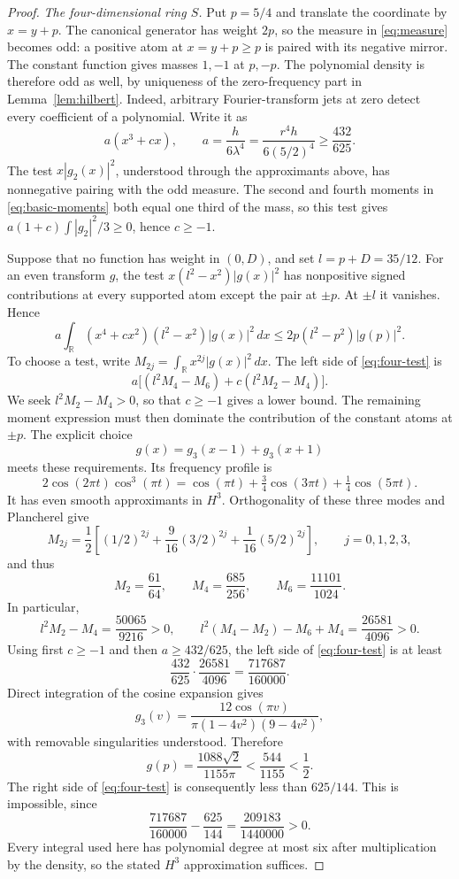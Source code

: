 \documentclass[11pt]{article}
\theoremstyle{definition}
\theoremstyle{remark}
\numberwithin{equation}{section}
\newcommand{\R}{\mathbb R}
\newcommand{\dd}{\,d}
\begin{document}
\begin{proof}
\emph{The four-dimensional ring \(S\).}
Put \(p=5/4\) and translate the coordinate by \(x=y+p\). The canonical generator has weight \(2p\), so the measure in \eqref{eq:measure} becomes odd: a positive atom at \(x=y+p\ge p\) is paired with its negative mirror. The constant function gives masses \(1,-1\) at \(p,-p\). The polynomial density is therefore odd as well, by uniqueness of the zero-frequency part in Lemma~\ref{lem:hilbert}. Indeed, arbitrary Fourier-transform jets at zero detect every coefficient of a polynomial. Write it as
\[
a(x^3+cx),\qquad
a=\frac h{6\lambda^4}
=\frac{r^4h}{6(5/2)^4}\ge\frac{432}{625}.
\]
The test \(x|g_2(x)|^2\), understood through the approximants above, has nonnegative pairing with the odd measure. The second and fourth moments in \eqref{eq:basic-moments} both equal one third of the mass, so this test gives \(a(1+c)\int|g_2|^2/3\ge0\), hence \(c\ge-1\).

Suppose that no function has weight in \((0,D)\), and set \(l=p+D=35/12\). For an even transform \(g\), the test \(x(l^2-x^2)|g(x)|^2\) has nonpositive signed contributions at every supported atom except the pair at \(\pm p\). At \(\pm l\) it vanishes. Hence
\begin{equation}\label{eq:four-test}
a\int_\R (x^4+cx^2)(l^2-x^2)|g(x)|^2\dd x
\le2p(l^2-p^2)|g(p)|^2.
\end{equation}
To choose a test, write \(M_{2j}=\int_\R x^{2j}|g(x)|^2\dd x\). The left side of \eqref{eq:four-test} is
\[
a\bigl[(l^2M_4-M_6)+c(l^2M_2-M_4)\bigr].
\]
We seek \(l^2M_2-M_4>0\), so that \(c\ge-1\) gives a lower bound. The remaining moment expression must then dominate the contribution of the constant atoms at \(\pm p\). The explicit choice
\[
g(x)=g_3(x-1)+g_3(x+1)
\]
meets these requirements. Its frequency profile is
\[
2\cos(2\pi t)\cos^3(\pi t)
=\cos(\pi t)+\tfrac34\cos(3\pi t)+\tfrac14\cos(5\pi t).
\]
It has even smooth approximants in \(H^3\). Orthogonality of these three modes and Plancherel give
\[
M_{2j}=\frac12\left[(1/2)^{2j}
+\frac9{16}(3/2)^{2j}+\frac1{16}(5/2)^{2j}\right],\qquad j=0,1,2,3,
\]
and thus
\[
M_2=\frac{61}{64},\qquad M_4=\frac{685}{256},
\qquad M_6=\frac{11101}{1024}.
\]
In particular,
\[
l^2M_2-M_4=\frac{50065}{9216}>0,
\qquad
l^2(M_4-M_2)-M_6+M_4=\frac{26581}{4096}>0.
\]
Using first \(c\ge-1\) and then \(a\ge432/625\), the left side of \eqref{eq:four-test} is at least
\[
\frac{432}{625}\cdot\frac{26581}{4096}
=\frac{717687}{160000}.
\]
Direct integration of the cosine expansion gives
\[
g_3(v)=\frac{12\cos(\pi v)}
{\pi(1-4v^2)(9-4v^2)},
\]
with removable singularities understood. Therefore
\[
g(p)=\frac{1088\sqrt2}{1155\pi}<\frac{544}{1155}<\frac12.
\]
The right side of \eqref{eq:four-test} is consequently less than \(625/144\). This is impossible, since
\[
\frac{717687}{160000}-\frac{625}{144}
=\frac{209183}{1440000}>0.
\]
Every integral used here has polynomial degree at most six after multiplication by the density, so the stated \(H^3\) approximation suffices.


\end{proof}
\end{document}
